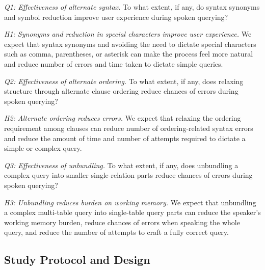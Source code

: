 \vspace{2mm}
\textit{Q1: Effectiveness of alternate syntax.} To what extent, if any, do syntax synonyms and symbol reduction improve user experience during spoken querying?

\vspace{2mm} 
\textit{H1: Synonyms and reduction in special characters improve user experience.} 
We expect that syntax synonyms and avoiding the need to dictate special characters such as comma, parentheses, or asterisk can make the process feel more natural and reduce number of errors and time taken to dictate simple queries. 

\vspace{2mm}
\textit{Q2: Effectiveness of alternate ordering.} To what extent, if any, does relaxing structure through alternate clause ordering reduce chances of errors during spoken querying?

\vspace{2mm} 
\textit{H2: Alternate ordering reduces errors.} 
We expect that relaxing the ordering requirement among clauses can reduce number of ordering-related syntax errors and reduce the amount of time and number of attempts required to dictate a simple or complex query. 

\vspace{2mm}
\textit{Q3: Effectiveness of unbundling.} To what extent, if any, does unbundling a complex query into smaller single-relation parts reduce chances of errors during spoken querying?

\vspace{2mm} 
\textit{H3: Unbundling reduces burden on working memory.} 
We expect that unbundling a complex multi-table query into single-table query parts can reduce the speaker's working memory burden, reduce chances of errors when speaking the whole query, and reduce the number of attempts to craft a fully correct query.


\subsection{Study Protocol and Design}

